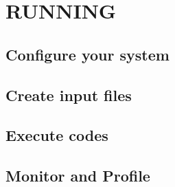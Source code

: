 \chapter{RUNNING}
\section{Configure your system}
\section{Create input files}
\section{Execute codes}
\section{Monitor and Profile}
